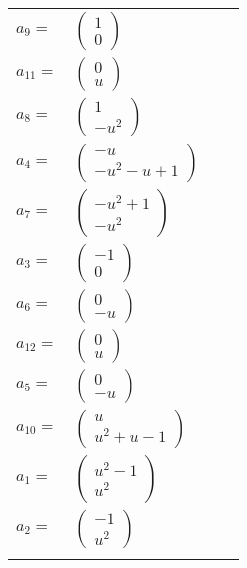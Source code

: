 \documentclass[1p]{elsarticle_modified}
\theoremstyle{definition}
\begin{document}
\begin{tabular}{m{7pt} m{180pt} m{7pt} m{180pt} }
\flushright $a_{9}=$&$\begin{pmatrix}1\\0\end{pmatrix}$ \\
\flushright $a_{11}=$&$\begin{pmatrix}0\\u\end{pmatrix}$ \\
\flushright $a_{8}=$&$\begin{pmatrix}1\\- u^2\end{pmatrix}$ \\
\flushright $a_{4}=$&$\begin{pmatrix}- u\\- u^2- u+1\end{pmatrix}$ \\
\flushright $a_{7}=$&$\begin{pmatrix}- u^2+1\\- u^2\end{pmatrix}$ \\
\flushright $a_{3}=$&$\begin{pmatrix}-1\\0\end{pmatrix}$ \\
\flushright $a_{6}=$&$\begin{pmatrix}0\\- u\end{pmatrix}$ \\
\flushright $a_{12}=$&$\begin{pmatrix}0\\u\end{pmatrix}$ \\
\flushright $a_{5}=$&$\begin{pmatrix}0\\- u\end{pmatrix}$ \\
\flushright $a_{10}=$&$\begin{pmatrix}u\\u^2+u-1\end{pmatrix}$ \\
\flushright $a_{1}=$&$\begin{pmatrix}u^2-1\\u^2\end{pmatrix}$ \\
\flushright $a_{2}=$&$\begin{pmatrix}-1\\u^2\end{pmatrix}$\\&\end{tabular}
\end{document}
